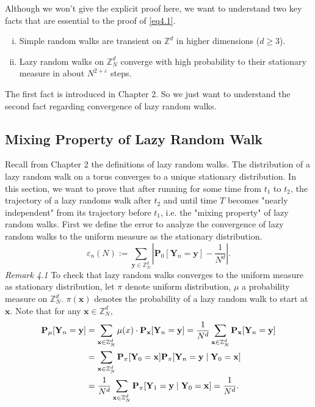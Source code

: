 \documentclass[
11pt, %
a4paper, %
oneside, %
headinclude,footinclude, %
BCOR5mm, %
]{scrartcl}
\begin{document}
Although we won't give the explicit proof here, we want to understand two key facts that are essential to the proof of \eqref{eq4.1}.
\begin{enumerate}[i.]
    \item Simple random walks are transient on $\mathbb{Z}^d$ in higher dimensions ($d \geq 3$).
    \item Lazy random walks on $\mathbb{Z}_N^d$ converge with high probability to their stationary measure in about $N^{2+\varepsilon}$ steps.
\end{enumerate}
The first fact is introduced in Chapter 2. So we just want to understand the second fact regarding convergence of lazy random walks.

\subsection{Mixing Property of Lazy Random Walk}
Recall from Chapter 2 the definitions of lazy random walks. The distribution of a lazy random walk on a torus converges to a unique stationary distribution. In this section, we want to prove that after running for some time from $t_1$ to $t_2$, the trajectory of a lazy randoms walk after $t_2$ and until time $T$ becomes "nearly independent" from its trajectory before $t_1$, i.e. the "mixing property" of lazy random walks. First we define the error to analyze the convergence of lazy random walks to the uniform measure as the stationary distribution.
\begin{equation}
    \varepsilon_n(N):= \sum_{\mathbf{y} \in \mathbb{Z}_N^d} \left| \mathbf{P}_0 [\mathbf{Y}_n=\mathbf{y}]-\frac{1}{N^d} \right|. \tag{4.4}
\end{equation}
\textit{Remark 4.1} To check that lazy random walks converges to the uniform measure as stationary distribution, let $\pi$ denote uniform distribution, $\mu$ a probability measure on $\mathbb{Z}_N^d$. $\pi(\mathbf{x})$ denotes the probability of a lazy random walk to start at $\mathbf{x}$. Note that for any $\mathbf{x} \in \mathbb{Z}_N^d$, 
\begin{align}
    \mathbf{P}_{\mu}[\mathbf{Y}_n=\mathbf{y}]&= \sum_{\mathbf{x} \in \mathbb{Z}_N^d} \mu(x) \cdot \mathbf{P}_{\mathbf{x}}[\mathbf{Y}_n=\mathbf{y}] = \frac{1}{N^d} \sum_{\mathbf{x} \in \mathbb{Z}_N^d} \mathbf{P}_{\mathbf{x}} [\mathbf{Y}_n=\mathbf{y}] \notag \\ 
    &=\sum_{\mathbf{x} \in \mathbb{Z}_N^d} \mathbf{P}_\pi[\mathbf{Y}_0=\mathbf{x}]\mathbf{P}_\pi[\mathbf{Y}_n=\mathbf{y} \mid \mathbf{Y}_0 = \mathbf{x}] \notag \\
    &=\frac{1}{N^d} \sum_{\mathbf{x} \in \mathbb{Z}_N^d} \mathbf{P}_\pi[ \mathbf{Y}_1=\mathbf{y} \mid \mathbf{Y}_0=\mathbf{x}] = \frac{1}{N^d}. \notag
\end{align}
\end{document}
